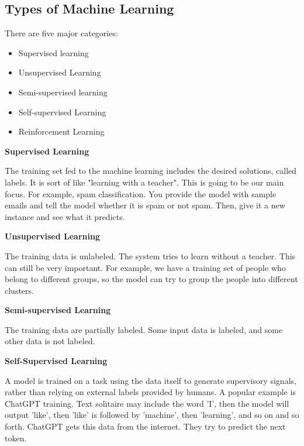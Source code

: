 {\vspace{11pt}
\subsection{Types of Machine Learning}
\vspace{11pt}

There are five major categories:
\begin{itemize}
    \item Supervised learning
    \item Unsupervised Learning
    \item Semi-supervised learning
    \item Self-supervised Learning
    \item Reinforcement Learning
\end{itemize}

\newpage
\textbf{Supervised Learning}
\vspace{11pt}

The training set fed to the machine learning includes the desired solutions, called labels. It is sort of like "learning with a teacher". This is going to be our main focus. For example, spam classification. You provide the model with sample emails and tell the model whether it is spam or not spam. Then, give it a new instance and see what it predicts.

\vspace{11pt}
\textbf{Unsupervised Learning}
\vspace{11pt}

The training data is unlabeled. The system tries to learn without a teacher. This can still be very important. For example, we have a training set of people who belong to different groups, so the model can try to group the people into different clusters.

\vspace{11pt}
\textbf{Semi-supervised Learning}
\vspace{11pt}

The training data are partially labeled. Some input data is labeled, and some other data is not labeled.

\vspace{11pt}
\textbf{Self-Supervised Learning}
\vspace{11pt}

A model is trained on a task using the data itself to generate supervisory signals, rather than relying on external labels provided by humans. A popular example is ChatGPT training. Text solitaire may include the word 'I', then the model will output 'like', then 'like' is followed by 'machine', then 'learning', and so on and so forth. ChatGPT gets this data from the internet. They try to predict the next token.

}
